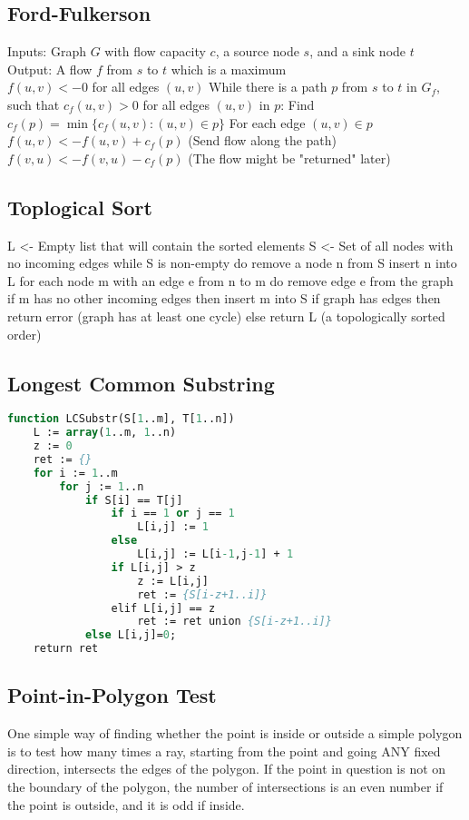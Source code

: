 \documentclass[10pt,a4paper]{article}
\begin{document}
\subsection*{Ford-Fulkerson}
Inputs: Graph $G$ with flow capacity $c$, a source node $s$, and a sink node $t$ \\
Output: A flow $f$ from $s$ to $t$ which is a maximum \\
$f(u,v) <- 0$ for all edges $(u,v)$
While there is a path $p$ from $s$ to $t$ in $G_f$, such that $c_f(u,v) > 0$ for all edges $(u,v)$ in $p$:
Find $c_f(p) = \min\{c_f(u,v) : (u,v) \in p\}$
For each edge $(u,v) \in p$
$f(u,v) <- f(u,v) + c_f(p)$ (Send flow along the path)
$f(v,u) <- f(v,u) - c_f(p)$ (The flow might be "returned" later)


\subsection*{Toplogical Sort}
L <- Empty list that will contain the sorted elements
S <- Set of all nodes with no incoming edges
while S is non-empty do
    remove a node n from S
    insert n into L
    for each node m with an edge e from n to m do
        remove edge e from the graph
        if m has no other incoming edges then
            insert m into S
if graph has edges then
    return error (graph has at least one cycle)
else 
    return L (a topologically sorted order)


\subsection*{Longest Common Substring}
\begin{lstlisting}[language=Pascal]
function LCSubstr(S[1..m], T[1..n])
    L := array(1..m, 1..n)
    z := 0
    ret := {}
    for i := 1..m
        for j := 1..n
            if S[i] == T[j]
                if i == 1 or j == 1
                    L[i,j] := 1
                else
                    L[i,j] := L[i-1,j-1] + 1
                if L[i,j] > z
                    z := L[i,j]
                    ret := {S[i-z+1..i]}
                elif L[i,j] == z
                    ret := ret union {S[i-z+1..i]}
            else L[i,j]=0;
    return ret
\end{lstlisting}


\subsection*{Point-in-Polygon Test}
One simple way of finding whether the point is inside or outside a simple polygon is to test how many times a ray, starting from the point and going ANY fixed direction, intersects the edges of the polygon. If the point in question is not on the boundary of the polygon, the number of intersections is an even number if the point is outside, and it is odd if inside. 
\end{document}
